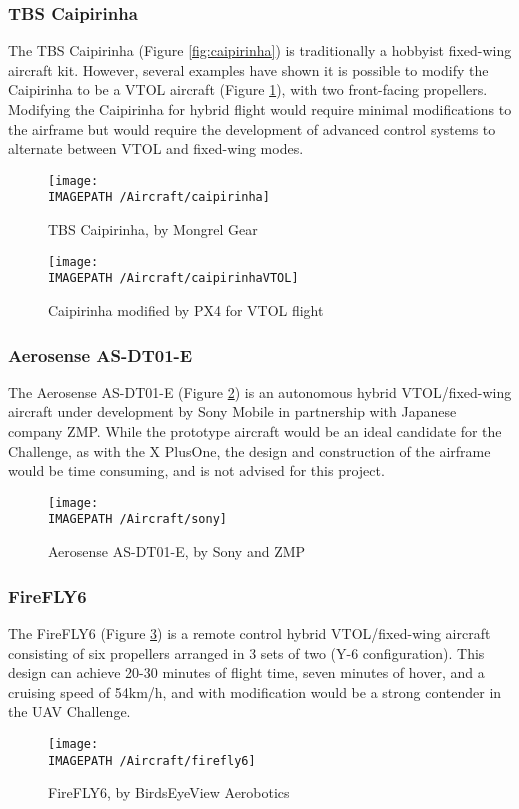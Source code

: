 \subsubsection*{TBS Caipirinha}
The TBS Caipirinha\cite{ref:caipirinha} (Figure \ref{fig:caipirinha}) is traditionally a hobbyist fixed-wing aircraft kit. However, several examples have shown it is possible to modify the Caipirinha to be a VTOL aircraft\cite{ref:caipirinhaVTOL} (Figure \ref{fig:caipirinhaVTOL}), with two front-facing propellers. Modifying the Caipirinha for hybrid flight would require minimal modifications to the airframe but would require the development of advanced control systems to alternate between VTOL and fixed-wing modes.

\begin{figure}[!ht]
	\centering
	\begin{minipage}{.5\textwidth}
		\centering
		\texttt{[image: \\IMAGEPATH /Aircraft/caipirinha]}
		\caption{TBS Caipirinha, by Mongrel Gear}
		\label{fig:caipirinha}
	\end{minipage}%
	\begin{minipage}{.5\textwidth}
		\centering
		\texttt{[image: \\IMAGEPATH /Aircraft/caipirinhaVTOL]}
		\caption{Caipirinha modified by PX4 for VTOL flight}
		\label{fig:caipirinhaVTOL}
	\end{minipage}
\end{figure}

\subsubsection*{Aerosense AS-DT01-E}
The Aerosense AS-DT01-E\cite{ref:sony} (Figure \ref{fig:sony}) is an autonomous hybrid VTOL/fixed-wing aircraft under development by Sony Mobile in partnership with Japanese company ZMP. While the prototype aircraft would be an ideal candidate for the Challenge, as with the X PlusOne, the design and construction of the airframe would be time consuming, and is not advised for this project.

\begin{figure}[!ht]
	\centering
	\texttt{[image: \\IMAGEPATH /Aircraft/sony]}
	\caption{Aerosense AS-DT01-E, by Sony and ZMP}
	\label{fig:sony}
\end{figure}

\subsubsection*{FireFLY6}
The FireFLY6\cite{ref:firefly6} (Figure \ref{fig:firefly6}) is a remote control hybrid VTOL/fixed-wing aircraft consisting of six propellers arranged in 3 sets of two (Y-6 configuration). This design can achieve 20-30 minutes of flight time, seven minutes of hover, and a cruising speed of 54km/h, and with modification would be a strong contender in the UAV Challenge.

\begin{figure}[!h]
	\centering
	\texttt{[image: \\IMAGEPATH /Aircraft/firefly6]}
	\caption{FireFLY6, by BirdsEyeView Aerobotics}
	\label{fig:firefly6}
\end{figure}